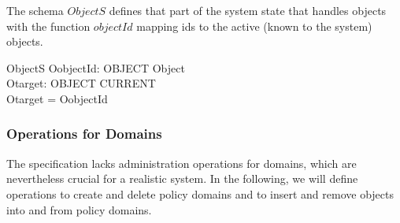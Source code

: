 The schema $ObjectS$ defines that part of the system state that handles objects
with the function $objectId$ mapping ids to the active (known to the system)
objects.
\begin{schema}{ObjectS}
  OobjectId: OBJECT \pinj Object \\
  Otarget: OBJECT \pfun CURRENT \\
  \where
  \dom Otarget = \dom OobjectId \\
\end{schema}


\subsubsection{Operations for Domains}

The \corbasec{} specification lacks administration operations for domains, which
are nevertheless crucial for a realistic system.  In the following, we will
define operations to create and delete policy domains and to insert and remove
objects into and from policy domains.


